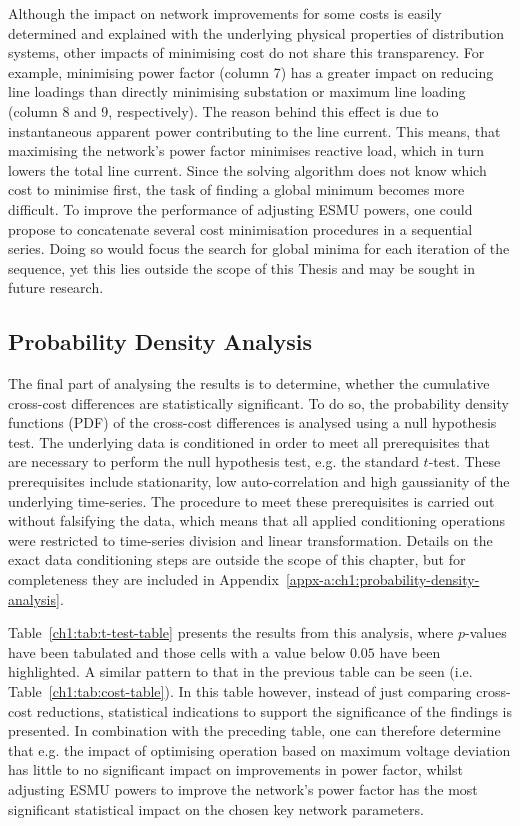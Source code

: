 Although the impact on network improvements for some costs is easily determined and explained with the underlying physical properties of distribution systems, other impacts of minimising cost do not share this transparency.
For example, minimising power factor (column 7) has a greater impact on reducing line loadings than directly minimising substation or maximum line loading (column 8 and 9, respectively).
The reason behind this effect is due to instantaneous apparent power contributing to the line current.
This means, that maximising the network's power factor minimises reactive load, which in turn lowers the total line current.
Since the solving algorithm does not know which cost to minimise first, the task of finding a global minimum becomes more difficult.
To improve the performance of adjusting ESMU powers, one could propose to concatenate several cost minimisation procedures in a sequential series.
Doing so would focus the search for global minima for each iteration of the sequence, yet this lies outside the scope of this Thesis and may be sought in future research.

\subsection{Probability Density Analysis}
\label{ch1:subsec:probability-density-analysis}

The final part of analysing the results is to determine, whether the cumulative cross-cost differences are statistically significant.
To do so, the probability density functions (PDF) of the cross-cost differences is analysed using a null hypothesis test.
The underlying data is conditioned in order to meet all prerequisites that are necessary to perform the null hypothesis test, e.g. the standard $t$-test.
These prerequisites include stationarity, low auto-correlation and high gaussianity of the underlying time-series.
The procedure to meet these prerequisites is carried out without falsifying the data, which means that all applied conditioning operations were restricted to time-series division and linear transformation.
Details on the exact data conditioning steps are outside the scope of this chapter, but for completeness they are included in Appendix~\ref{appx-a:ch1:probability-density-analysis}.



Table~\ref{ch1:tab:t-test-table} presents the results from this analysis, where $p$-values have been tabulated and those cells with a value below $0.05$ have been highlighted.
A similar pattern to that in the previous table can be seen (i.e. Table~\ref{ch1:tab:cost-table}).
In this table however, instead of just comparing cross-cost reductions, statistical indications to support the significance of the findings is presented.
In combination with the preceding table, one can therefore determine that e.g. the impact of optimising operation based on maximum voltage deviation has little to no significant impact on improvements in power factor, whilst adjusting ESMU powers to improve the network's power factor has the most significant statistical impact on the chosen key network parameters.